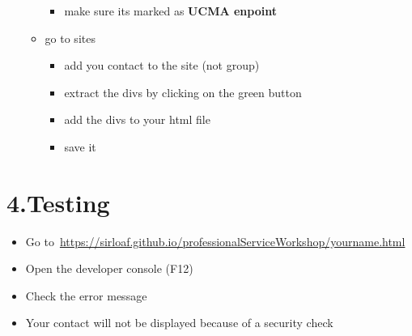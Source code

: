 \documentclass{article}
\begin{document}
\begin{itemize}[noitemsep,topsep=\mdcompacttopsep]
\begin{itemize}[noitemsep,topsep=\mdcompacttopsep]
\begin{itemize}[noitemsep,topsep=\mdcompacttopsep]
\item{}make sure its marked as \textbf{UCMA enpoint}%
\end{itemize}%

\item{}go to sites

\begin{itemize}[noitemsep,topsep=\mdcompacttopsep]%

\item{}add you contact to the site (not group)%

\item{}extract the divs by clicking on the green button%

\item{}add the divs to your html file%

\item{}save it%
\end{itemize}%
\end{itemize}%
\end{itemize}%

\section{4.\hspace*{0.5em}Testing}\label{sec-testing}%

\begin{itemize}[noitemsep,topsep=\mdcompacttopsep]%

\item{}Go to~\href{https://sirloaf.github.io/professionalServiceWorkshop/yourname.html}{https://sirloaf.github.io/professionalServiceWorkshop/yourname.html}%

\item{}Open the developer console (F12)%

\item{}Check the error message%

\item{}Your contact will not be displayed because of a security check%
\end{itemize}%
\end{document}
